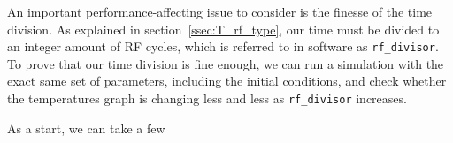 An important performance-affecting issue to consider is the finesse of the time division. As explained in section~\ref{ssec:T_rf_type}, our time must be divided to an integer amount of RF cycles, which is referred to in software as \texttt{rf\_divisor}. To prove that our time division is fine enough, we can run a simulation with the exact same set of parameters, including the initial conditions, and check whether the temperatures graph is changing less and less as \texttt{rf\_divisor} increases.

As a start, we can take a few

